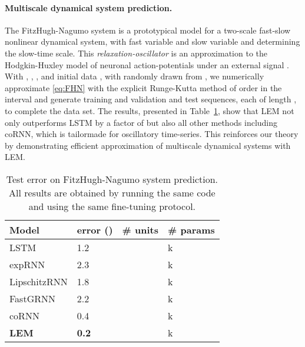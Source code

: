 \documentclass{article} \usepackage{iclr2022_conference,times}
\newcommand{\Tref}[1]{Table~\ref{#1}}
\begin{document}
\paragraph{Multiscale dynamical system prediction.}
The FitzHugh-Nagumo system \citep{Fitznag} 
is a prototypical model for a two-scale fast-slow nonlinear dynamical system, with fast variable  and slow variable  and  determining the slow-time scale. This \emph{relaxation-oscillator} is an approximation to the Hodgkin-Huxley model \citep{HH} of neuronal action-potentials under an external signal . With , , ,  and initial data , with  randomly drawn from , we numerically approximate \eqref{eq:FHN} with the explicit Runge-Kutta method of order  in the interval  and generate  training and validation and  test sequences, each of length , to complete the data set. The results, presented in \Tref{tab:FHN}, show that LEM not only outperforms LSTM by a factor of  but also all other methods including coRNN, which is tailormade for oscillatory time-series. This reinforces our theory by demonstrating efficient approximation of multiscale dynamical systems with LEM.     
\begin{table}[t!]
  \caption{Test  error on FitzHugh-Nagumo system prediction. All results are obtained by running the same code and using the same fine-tuning protocol.}
  \label{tab:FHN}
  \centering
  \begin{tabular}{llll}
    \toprule
    \cmidrule(r){1-4}
    Model &  error () & \# units & \# params \\
    \midrule
LSTM  & 1.2 &  & k\\
expRNN  & 2.3 &  & k  \\
LipschitzRNN  & 1.8 &  & k   \\
FastGRNN  & 2.2 &  & k \\
coRNN  & 0.4 &  & k \\
\textbf{LEM}  & {\bf 0.2} &  & k \\
\bottomrule
\end{tabular}
\end{table}
\end{document}
